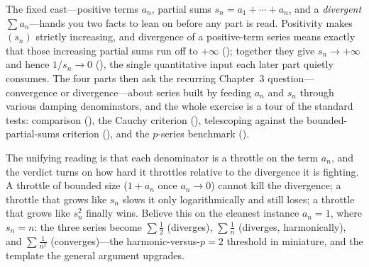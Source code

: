 \documentclass[main.tex]{subfiles}
\begin{document}
\begin{Reflection}
The fixed cast---positive terms $a_n$, partial sums $s_n=a_1+\cdots+a_n$, and a \emph{divergent}
$\sum a_n$---hands you two facts to lean on before any part is read. Positivity makes $(s_n)$ strictly
increasing, and divergence of a positive-term series means exactly that those increasing partial sums
run off to $+\infty$ (); together they give $s_n\to+\infty$ and hence $1/s_n\to 0$
(), the single quantitative input each later part quietly consumes.
The four parts then ask the recurring Chapter~3 question---convergence or divergence---about series
built by feeding $a_n$ and $s_n$ through various damping denominators, and the whole exercise is a tour
of the standard tests: comparison (), the Cauchy criterion (), telescoping
against the bounded-partial-sums criterion (), and the $p$-series benchmark
().

The unifying reading is that each denominator is a throttle on the term $a_n$, and the verdict turns on
how hard it throttles relative to the divergence it is fighting. A throttle of bounded size ($1+a_n$
once $a_n\to 0$) cannot kill the divergence; a throttle that grows like $s_n$ slows it only
logarithmically and still loses; a throttle that grows like $s_n^2$ finally wins. Believe this on the
cleanest instance $a_n=1$, where $s_n=n$: the three series become $\sum\frac{1}{2}$ (diverges),
$\sum\frac1n$ (diverges, harmonically), and $\sum\frac{1}{n^2}$ (converges)---the harmonic-versus-$p=2$
threshold in miniature, and the template the general argument upgrades.


\end{Reflection}
\end{document}
